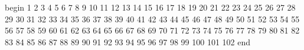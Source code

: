 begin
1
2
3
4
5
6
7
8
9
10
11
12
13
14
15
16
17
18
19
20
21
22
23
24
25
26
27
28
29
30
31
32
33
34
35
36
37
38
39
40
41
42
43
44
45
46
47
48
49
50
51
52
53
54
55
56
57
58
59
60
61
62
63
64
65
66
67
68
69
70
71
72
73
74
75
76
77
78
79
80
81
82
83
84
85
86
87
88
89
90
91
92
93
94
95
96
97
98
99
100
101
102
end